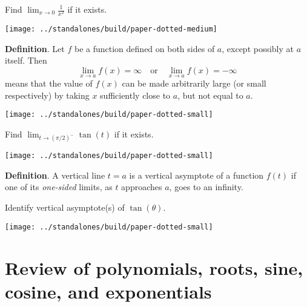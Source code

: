 \documentclass[../main.tex]{subfiles}
\begin{document}
\begin{example}
  Find \(\lim_{x \to 0} \frac{1}{x^{2}}\) if it exists.
\end{example}
\texttt{[image: ../standalones/build/paper-dotted-medium]}

\begin{mdframed}[style=withref]
  \textbf{Definition}. Let \(f\) be a function defined on both sides of \(a\), except possibly at \(a\) itself. Then
  \[
    \lim_{x \to a} f(x) = \infty
    \quad\text{or}\quad
    \lim_{x \to a} f(x) = -\infty
  \]
  means that the value of \(f(x)\) can be made arbitrarily large (or small respectively) by taking \(x\) sufficiently close to \(a\), but not equal to \(a\).

\end{mdframed}
\texttt{[image: ../standalones/build/paper-dotted-small]}

\begin{example}
  Find \(\lim_{t \to (\pi/2)^{-}} \tan(t)\) if it exists.
\end{example}
\texttt{[image: ../standalones/build/paper-dotted-small]}

\begin{mdframed}[style=withref]
  \textbf{Definition}. A vertical line \(t = a\) is a {vertical asymptote} of a function \(f(t)\) if one of its \emph{one-sided} limits, as \(t\) approaches \(a\), goes to an infinity.

\end{mdframed}
\vfill

\begin{example}
  Identify vertical asymptote(s) of \(\tan(\theta)\).
\end{example}
\texttt{[image: ../standalones/build/paper-dotted-small]}
\clearpage

\section{Review of polynomials, roots, sine, cosine, and exponentials}
\end{document}
